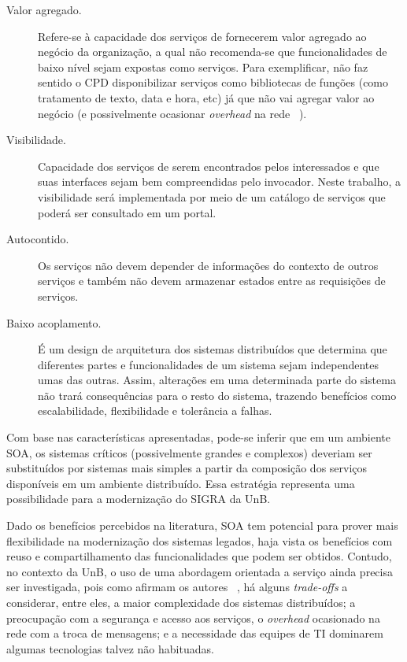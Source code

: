 \begin{description}
\item[Valor agregado.] Refere-se à capacidade dos serviços de fornecerem 
valor agregado ao negócio da organização, a qual não recomenda-se que 
funcionalidades de baixo nível sejam expostas como serviços. Para exemplificar, não faz sentido o \acrshort{CPD} disponibilizar serviços como bibliotecas de funções (como tratamento de texto, data e hora, etc) já que não vai agregar valor ao negócio (e possivelmente ocasionar \textit{overhead} na rede ~\cite{fielding2000architectural}).

\item[Visibilidade.] Capacidade dos serviços de serem encontrados pelos 
interessados e que suas interfaces sejam bem compreendidas pelo invocador. Neste trabalho, a visibilidade será implementada por meio de um catálogo de serviços que poderá ser consultado em um portal.

\item[Autocontido.] Os serviços não devem depender de informações do contexto
de outros serviços e também não devem armazenar estados entre as requisições de serviços.

\item[Baixo acoplamento.] É um design de arquitetura dos sistemas distribuídos que 
determina que diferentes partes e funcionalidades de um sistema sejam independentes umas das outras. 
Assim, alterações em uma determinada parte do sistema não trará consequências para o resto do sistema, 
trazendo benefícios como escalabilidade, flexibilidade e tolerância a falhas.
\end{description}

Com base nas características apresentadas, pode-se inferir que em um ambiente \acrshort{SOA}, os sistemas críticos (possivelmente grandes e complexos) deveriam ser substituídos por sistemas mais simples a partir da composição dos serviços disponíveis em um ambiente distribuído. Essa estratégia representa uma possibilidade para a modernização do \acrfull{SIGRA} da \acrlong{UnB}. 

Dado os benefícios percebidos na literatura, \acrshort{SOA} tem potencial para prover mais flexibilidade na modernização dos sistemas legados, haja vista os benefícios com reuso e compartilhamento das funcionalidades que podem ser obtidos. Contudo, no contexto da \acrshort{UnB}, o uso de uma abordagem orientada a serviço ainda precisa ser investigada, pois como afirmam os autores ~\cite{fielding2000architectural,ModelDriApproRest:2014,SOAIntBlueprint:2010,SOA_patterns_2012}, há alguns \textit{trade-offs} a considerar, entre eles, a maior complexidade dos sistemas distribuídos; a preocupação com a segurança e acesso aos serviços, o \textit{overhead} ocasionado na rede com a troca de mensagens; e a necessidade das equipes de TI dominarem algumas tecnologias talvez não habituadas.


